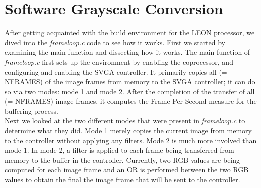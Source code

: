 \documentclass{article}
\begin{document}
 
\section{Software Grayscale Conversion}
After getting acquainted with the build environment for the LEON processor, we dived into the \textit{frameloop.c} code to see how it works. First we started by examining the main function and dissecting how it works. The main function of \textit{frameloop.c} first sets up the environment by enabling the coprocessor, and configuring and enabling the SVGA controller. It primarily copies all (= NFRAMES) of the image frames from memory to the SVGA controller; it can do so via two modes: mode 1 and mode 2. After the completion of the transfer of all (= NFRAMES) image frames, it computes the Frame Per Second measure for the buffering process. \\

Next we looked at the two different modes that were present in \textit{frameloop.c} to determine what they did. Mode 1 merely copies the current image from memory to the controller without applying any filters. Mode 2 is much more involved than mode 1. In mode 2, a filter is applied to each frame being transferred from memory to the buffer in the controller. Currently, two RGB values are being computed for each image frame and an OR is performed between the two RGB values to obtain the final the image frame that will be sent to the controller.
\end{document}
